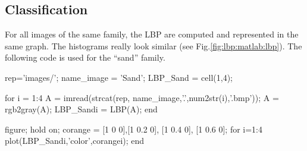 \subsection{Classification}
For all images of the same family, the LBP are computed and represented in the same graph. The histograms really look similar (see Fig.\ref{fig:lbp:matlab:lbp}). The following code is used for the ``sand'' family.

\begin{matlab}
rep='images/';
name_image = 'Sand';
LBP_Sand = cell(1,4);

for i = 1:4
    A = imread(strcat(rep, name_image,'.',num2str(i),'.bmp'));
    A = rgb2gray(A);
    LBP_Sand{i} = LBP(A);
end

figure;
hold on;
corange = {[1 0 0],[1 0.2 0], [1 0.4 0], [1 0.6 0]};
for i=1:4
    plot(LBP_Sand{i},'color',corange{i});
end
\end{matlab}

